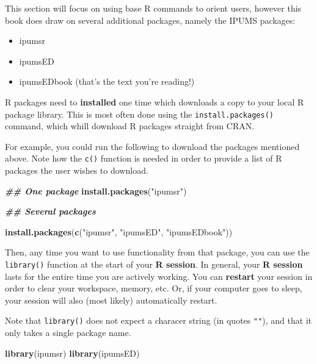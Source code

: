 \documentclass[
]{book}
\newenvironment{Shaded}{\begin{snugshade}}{\end{snugshade}}
\newcommand{\DocumentationTok}[1]{\textcolor[rgb]{0.56,0.35,0.01}{\textbf{\textit{#1}}}}
\newcommand{\FunctionTok}[1]{\textcolor[rgb]{0.13,0.29,0.53}{\textbf{#1}}}
\newcommand{\NormalTok}[1]{#1}
\newcommand{\StringTok}[1]{\textcolor[rgb]{0.31,0.60,0.02}{#1}}
\providecommand{\tightlist}{%
  \setlength{\itemsep}{0pt}\setlength{\parskip}{0pt}}
\begin{document}
This section will focus on using base R commands to orient users, however this book does draw on several additional packages, namely the IPUMS packages:

\begin{itemize}
\tightlist
\item
  ipumsr
\item
  ipumsED
\item
  ipumsEDbook (that's the text you're reading!)
\end{itemize}

R packages need to \textbf{installed} one time which downloads a copy to your local R package library. This is most often done using the \texttt{install.packages()} command, which whill download R packages straight from CRAN.

For example, you could run the following to download the packages mentioned above. Note how the \texttt{c()} function is needed in order to provide a list of R packages the user wishes to download.

\begin{Shaded}
\begin{Highlighting}[]
\DocumentationTok{\#\# One package}
\FunctionTok{install.packages}\NormalTok{(}\StringTok{"ipumsr"}\NormalTok{)}


\DocumentationTok{\#\# Several packages}

\FunctionTok{install.packages}\NormalTok{(}\FunctionTok{c}\NormalTok{(}\StringTok{"ipumsr"}\NormalTok{, }\StringTok{"ipumsED"}\NormalTok{, }\StringTok{"ipumsEDbook"}\NormalTok{))}
\end{Highlighting}
\end{Shaded}

Then, any time you want to use functionality from that package, you can use the \texttt{library()} function at the start of your \textbf{R session}. In general, your \textbf{R session} lasts for the entire time you are actively working. You can \textbf{restart} your session in order to clear your workspace, memory, etc. Or, if your computer goes to sleep, your session will also (most likely) automatically restart.

Note that \texttt{library()} does not expect a characer string (in quotes \texttt{""}), and that it only takes a single package name.

\begin{Shaded}
\begin{Highlighting}[]
\FunctionTok{library}\NormalTok{(ipumsr)}
\FunctionTok{library}\NormalTok{(ipumsED)}
\end{Highlighting}
\end{Shaded}
\end{document}
